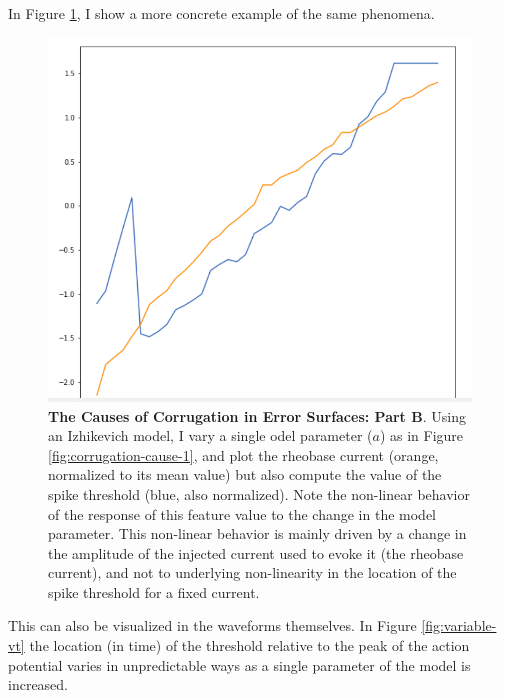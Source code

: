 In Figure \ref{fig:corrugation-cause-2}, I show a more concrete example of the same phenomena.
\begin{figure}
\begin{center}
\includegraphics[]{figures/rh_vs_vt.png}
\caption[Causes of Corrugation (2)]{\textbf{The Causes of Corrugation in Error Surfaces: Part B}.
Using an Izhikevich model, I vary a single odel parameter ($a$) as in Figure \ref{fig:corrugation-cause-1}, and plot the rheobase current (orange, normalized to its mean value) but also compute the value of the spike threshold (blue, also normalized).
Note the non-linear behavior of the response of this feature value to the change in the model parameter.
This non-linear behavior is mainly driven by a change in the amplitude of the injected current used to evoke it (the rheobase current), and not to underlying non-linearity in the location of the spike threshold for a fixed current.}
\label{fig:corrugation-cause-2}
\end{center}
\end{figure}

This can also be visualized in the waveforms themselves.
In Figure \ref{fig:variable-vt} the location (in time) of the threshold relative to the peak of the action potential varies in unpredictable ways as a single parameter of the model is increased.

